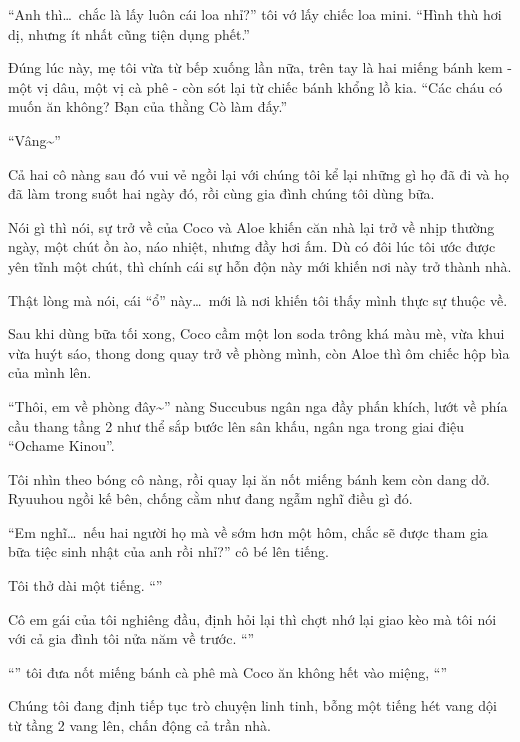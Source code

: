 \documentclass[../main.tex]{subfiles}
\begin{document}
``Anh thì\dots\ chắc là lấy luôn cái loa nhỉ?'' tôi vớ lấy chiếc loa mini. ``Hình thù hơi dị, nhưng ít nhất cũng tiện dụng phết.''

Đúng lúc này, mẹ tôi vừa từ bếp xuống lần nữa, trên tay là hai miếng bánh kem - một vị dâu, một vị cà phê - còn sót lại từ chiếc bánh khổng lồ kia. ``Các cháu có muốn ăn không? Bạn của thằng Cò làm đấy.''

``Vâng\~{}''

Cả hai cô nàng sau đó vui vẻ ngồi lại với chúng tôi kể lại những gì họ đã đi và họ đã làm trong suốt hai ngày đó, rồi cùng gia đình chúng tôi dùng bữa.

Nói gì thì nói, sự trở về của Coco và Aloe khiến căn nhà lại trở về nhịp thường ngày, một chút ồn ào, náo nhiệt, nhưng đầy hơi ấm. Dù có đôi lúc tôi ước được yên tĩnh một chút, thì chính cái sự hỗn độn này mới khiến nơi này trở thành nhà.

Thật lòng mà nói, cái ``ổ'' này\dots\ mới là nơi khiến tôi thấy mình thực sự thuộc về.

\ct

Sau khi dùng bữa tối xong, Coco cầm một lon soda trông khá màu mè, vừa khui vừa huýt sáo, thong dong quay trở về phòng mình, còn Aloe thì ôm chiếc hộp bìa của mình lên.

``Thôi, em về phòng đây\~{}'' nàng Succubus ngân nga đầy phấn khích, lướt về phía cầu thang tầng 2 như thể sắp bước lên sân khấu, ngân nga trong giai điệu ``Ochame Kinou''.

Tôi nhìn theo bóng cô nàng, rồi quay lại ăn nốt miếng bánh kem còn dang dở. Ryuuhou ngồi kế bên, chống cằm như đang ngẫm nghĩ điều gì đó.

``Em nghĩ\dots\ nếu hai người họ mà về sớm hơn một hôm, chắc sẽ được tham gia bữa tiệc sinh nhật của anh rồi nhỉ?'' cô bé lên tiếng.

Tôi thở dài một tiếng. ``''

Cô em gái của tôi nghiêng đầu, định hỏi lại thì chợt nhớ lại giao kèo mà tôi nói với cả gia đình tôi nửa năm về trước. ``''

``'' tôi đưa nốt miếng bánh cà phê mà Coco ăn không hết vào miệng, ``''

Chúng tôi đang định tiếp tục trò chuyện linh tinh, bỗng một tiếng hét vang dội từ tầng 2 vang lên, chấn động cả trần nhà.
\end{document}

